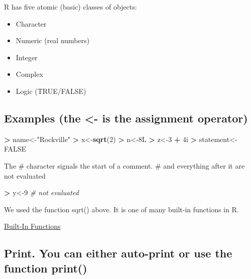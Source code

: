 \documentclass[]{article}
\newenvironment{Shaded}{\begin{snugshade}}{\end{snugshade}}
\newcommand{\KeywordTok}[1]{\textcolor[rgb]{0.13,0.29,0.53}{\textbf{#1}}}
\newcommand{\DecValTok}[1]{\textcolor[rgb]{0.00,0.00,0.81}{#1}}
\newcommand{\StringTok}[1]{\textcolor[rgb]{0.31,0.60,0.02}{#1}}
\newcommand{\CommentTok}[1]{\textcolor[rgb]{0.56,0.35,0.01}{\textit{#1}}}
\newcommand{\OtherTok}[1]{\textcolor[rgb]{0.56,0.35,0.01}{#1}}
\newcommand{\OperatorTok}[1]{\textcolor[rgb]{0.81,0.36,0.00}{\textbf{#1}}}
\newcommand{\NormalTok}[1]{#1}
\providecommand{\tightlist}{%
  \setlength{\itemsep}{0pt}\setlength{\parskip}{0pt}}
\begin{document}
R has five atomic (basic) classes of objects:

\begin{itemize}
\tightlist
\item
  Character
\item
  Numeric (real numbers)
\item
  Integer
\item
  Complex
\item
  Logic (TRUE/FALSE)
\end{itemize}

\subsection{Examples (the \textless{}- is the assignment
operator)}\label{examples-the---is-the-assignment-operator}

\begin{Shaded}
\begin{Highlighting}[]
\OperatorTok{>}\StringTok{ }\NormalTok{name<-}\StringTok{"Rockville"}
\OperatorTok{>}\StringTok{ }\NormalTok{x<-}\KeywordTok{sqrt}\NormalTok{(}\DecValTok{2}\NormalTok{)}
\OperatorTok{>}\StringTok{ }\NormalTok{n<-8L}
\OperatorTok{>}\StringTok{ }\NormalTok{z<-}\DecValTok{3} \OperatorTok{+}\StringTok{ }\NormalTok{4i}
\OperatorTok{>}\StringTok{ }\NormalTok{statement<-}\OtherTok{FALSE}
\end{Highlighting}
\end{Shaded}

The \# character signals the start of a comment. \# and everything after
it are not evaluated

\begin{Shaded}
\begin{Highlighting}[]
\OperatorTok{>}\StringTok{ }\NormalTok{y<-}\DecValTok{9} \CommentTok{# not evaluated}
\end{Highlighting}
\end{Shaded}

We used the function sqrt() above. It is one of many built-in functions
in R.

\href{http://www.statmethods.net/management/functions.html}{Built-In
Functions}

\subsection{Print. You can either auto-print or use the function
print()}\label{print.-you-can-either-auto-print-or-use-the-function-print}
\end{document}
